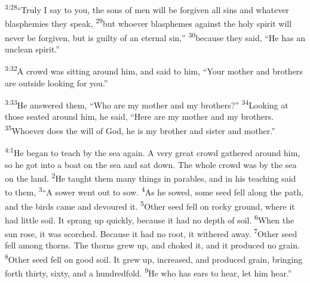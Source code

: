 \documentclass[openany,12pt,english]{book}
\newenvironment{para}{\par\pretolerance=100\tolerance=200\setlength{\emergencystretch}{0.6em}\relax}{\par}
\begin{document}
\begin{para}
    \textsuperscript{3:28}\thinspace{}“Tru\-ly I say to you, the sons of men will be for\-giv\-en all sins and what\-ev\-er blasphemies they speak,
    \textsuperscript{29}\thinspace{}but who\-ev\-er blasphemes against the ho\-ly spir\-it will nev\-er be for\-giv\-en, but is guilt\-y of an e\-ter\-nal sin,”
    \textsuperscript{30}\thinspace{}be\-cause they said, “He has an un\-clean spir\-it.”
\end{para}

\bigskip{}

\begin{para}
    \textsuperscript{3:32}\thinspace{}A crowd was sit\-ting a\-round him, and said to him, “Your moth\-er and brothers are out\-side looking for you.”
\end{para}

\begin{para}
    \textsuperscript{3:33}\thinspace{}He answered them, “Who are my moth\-er and my brothers?”
    \textsuperscript{34}\thinspace{}Looking at those seated a\-round him, he said, “Here are my moth\-er and my brothers.
    \textsuperscript{35}\thinspace{}Who\-ev\-er does the will of God, he is my broth\-er and sis\-ter and moth\-er.”
\end{para}

\bigskip{}

\begin{para}
    \textsuperscript{4:1}\thinspace{}He be\-gan to teach by the sea again. A ver\-y great crowd gathered a\-round him, so he got in\-to a boat on the sea and sat down. The whole crowd was by the sea on the land.
    \textsuperscript{2}\thinspace{}He taught them man\-y things in parables, and in his teach\-ing said to them,
    \textsuperscript{3}\thinspace{}“A sower went out to sow.
    \textsuperscript{4}\thinspace{}As he sowed, some seed fell a\-long the path, and the birds came and devoured it.
    \textsuperscript{5}\thinspace{}Oth\-er seed fell on rock\-y ground, where it had lit\-tle soil. It sprang up quick\-ly, be\-cause it had no depth of soil.
    \textsuperscript{6}\thinspace{}When the sun rose, it was scorched. Be\-cause it had no root, it withered a\-way.
    \textsuperscript{7}\thinspace{}Oth\-er seed fell a\-mong thorns. The thorns grew up, and choked it, and it pro\-duced no grain.
    \textsuperscript{8}\thinspace{}Oth\-er seed fell on good soil. It grew up, in\-creased, and pro\-duced grain, bring\-ing forth thir\-ty, six\-ty, and a hun\-dred\-fold.
    \textsuperscript{9}\thinspace{}He who has ears to hear, let him hear.”
\end{para}
\end{document}
